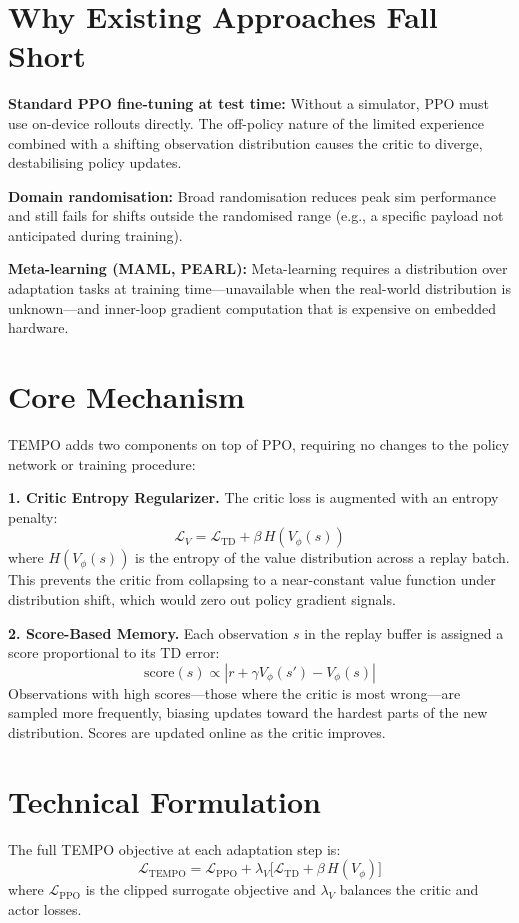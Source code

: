 \documentclass[10pt,twocolumn]{article}
\begin{document}
\section{Why Existing Approaches Fall Short}

\textbf{Standard PPO fine-tuning at test time:}
Without a simulator, PPO must use on-device rollouts directly. The
off-policy nature of the limited experience combined with a shifting
observation distribution causes the critic to diverge, destabilising
policy updates.

\textbf{Domain randomisation:}
Broad randomisation reduces peak sim performance and still fails for
shifts outside the randomised range (e.g., a specific payload not
anticipated during training).

\textbf{Meta-learning (MAML, PEARL):}
Meta-learning requires a distribution over adaptation tasks at training
time---unavailable when the real-world distribution is unknown---and
inner-loop gradient computation that is expensive on embedded hardware.

\section{Core Mechanism}

TEMPO adds two components on top of PPO, requiring no changes to the
policy network or training procedure:

\textbf{1. Critic Entropy Regularizer.}
The critic loss is augmented with an entropy penalty:
\[
\mathcal{L}_V = \mathcal{L}_\mathrm{TD} + \beta\, H(V_\phi(s))
\]
where $H(V_\phi(s))$ is the entropy of the value distribution across
a replay batch. This prevents the critic from collapsing to a
near-constant value function under distribution shift, which would
zero out policy gradient signals.

\textbf{2. Score-Based Memory.}
Each observation $s$ in the replay buffer is assigned a score
proportional to its TD error:
\[
\mathrm{score}(s) \propto |r + \gamma V_\phi(s') - V_\phi(s)|
\]
Observations with high scores---those where the critic is most
wrong---are sampled more frequently, biasing updates toward the
hardest parts of the new distribution. Scores are updated online as
the critic improves.

\section{Technical Formulation}

The full TEMPO objective at each adaptation step is:
\[
\mathcal{L}_\mathrm{TEMPO} = \mathcal{L}_\mathrm{PPO} +
  \lambda_V \bigl[\mathcal{L}_\mathrm{TD} + \beta\, H(V_\phi)\bigr]
\]
where $\mathcal{L}_\mathrm{PPO}$ is the clipped surrogate objective
and $\lambda_V$ balances the critic and actor losses.
\end{document}
